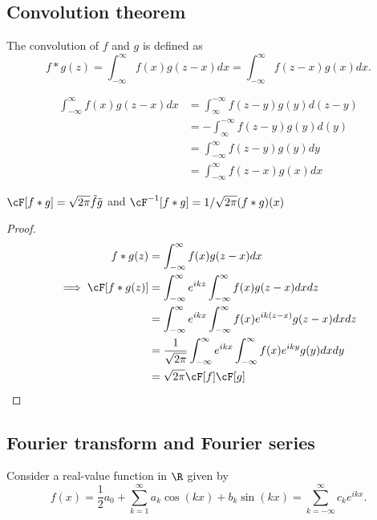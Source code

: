 \begin{refsection}
\subsection{Convolution theorem}
\begin{definition}
	The convolution of $f$ and $g$ is defined as
	$$f*g(z) = \int_{-\infty}^{\infty} f(x)g(z-x)dx = \int_{-\infty}^{\infty} f(z-x)g(x)dx.$$
\end{definition}

\begin{remark}
	\begin{align*}
	\int_{-\infty}^{\infty} f(x)g(z-x)dx &= \int_{\infty}^{-\infty} f(z-y)g(y)d(z-y) \\
	&= -\int_{\infty}^{-\infty} f(z-y)g(y)d(y) \\
	&= \int_{-\infty}^{\infty} f(z-y)g(y)dy\\
	& = \int_{-\infty}^{\infty} f(z-x)g(x)dx
	\end{align*}	
\end{remark}


\begin{lemma}\cite[271]{prosperetti2013advanced}
	$\cF[f*g] = \sqrt{2\pi} \tilde{f}\tilde{g}$
	and
	$\cF^{-1}[f*g] = 1/\sqrt{2\pi} (f*g)(x)$
\end{lemma}
\begin{proof}
	\begin{align*}
	f*g(z) &= \int_{-\infty}^{\infty} f(x)g(z-x) dx \\
	\implies \cF[f*g(z)] &= \int_{-\infty}^{\infty} e^{ikz}\int_{-\infty}^{\infty} f(x)g(z-x) dx dz \\
	&=\int_{-\infty}^{\infty} e^{ikx}\int_{-\infty}^{\infty} f(x)e^{ik(z-x)}g(z-x) dx dz \\
	&=\frac{1}{\sqrt{2\pi}}\int_{-\infty}^{\infty} e^{ikx}\int_{-\infty}^{\infty} f(x)e^{iky}g(y) dx dy \\
	&=\sqrt{2\pi} \cF[f]\cF[g]
	\end{align*}	
\end{proof}



\subsection{Fourier transform and Fourier series}

\begin{lemma}\cite[271]{prosperetti2013advanced}
	Consider a real-value function in $\R$ given by
	$$f(x) = \frac{1}{2}a_0 + \sum_{k=1}^\infty a_k \cos(kx) + b_k \sin(kx) = \sum_{k=-\infty}^{\infty} c_k e^{ikx}.$$	
	

\end{lemma}
\end{refsection}
